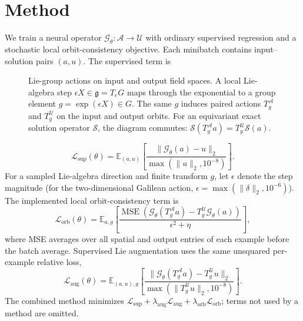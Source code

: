 \section{Method}
\label{sec:method}

We train a neural operator \(\mathcal G_\theta:\mathcal A\to\mathcal U\) with ordinary supervised regression and a stochastic local orbit-consistency objective. Each minibatch contains input--solution pairs \((a,u)\). The supervised term is

\begin{figure}[t]
\centering
\resizebox{0.92\linewidth}{!}{%

}
\caption{
Lie-group actions on input and output field spaces.
A local Lie-algebra step \(\epsilon X\in\mathfrak g=T_eG\) maps through the exponential to a group element \(g=\exp(\epsilon X)\in G\). The same \(g\) induces paired actions \(T_g^{\mathcal A}\) and \(T_g^{\mathcal U}\) on the input and output orbits. For an equivariant exact solution operator \(\mathcal S\), the diagram commutes: \(\mathcal S(T_g^{\mathcal A}a)=T_g^{\mathcal U}\mathcal S(a)\).
}
\label{fig:lie-group-actions}
\end{figure}

\begin{equation}
\mathcal L_{\mathrm{sup}}(\theta)=\mathbb E_{(a,u)}\left[
\frac{\|\mathcal G_\theta(a)-u\|_2}{\max(\|u\|_2,10^{-8})}
\right].
\end{equation}
For a sampled Lie-algebra direction and finite transform \(g\), let
\(\epsilon\) denote the step magnitude (for the two-dimensional Galilean action,
\(\epsilon=\max(\|\delta\|_2,10^{-6})\)).  The implemented local
orbit-consistency term is
\begin{equation}
\mathcal L_{\mathrm{orb}}(\theta)=\mathbb E_{a,g}\left[
\frac{\operatorname{MSE}\!\left(
\mathcal G_\theta(T_g^{\mathcal A}a)-T_g^{\mathcal U}\mathcal G_\theta(a)
\right)}{\epsilon^2+\eta}\right],
\end{equation}
where MSE averages over all spatial and output entries of each example before the
batch average.  Supervised Lie augmentation uses the same unsquared per-example
relative loss,
\begin{equation}
\mathcal L_{\mathrm{aug}}(\theta)=\mathbb E_{(a,u),g}\left[
\frac{\|\mathcal G_\theta(T_g^{\mathcal A}a)-T_g^{\mathcal U}u\|_2}
{\max(\|T_g^{\mathcal U}u\|_2,10^{-8})}\right].
\end{equation}
The combined method minimizes
\(\mathcal L_{\mathrm{sup}}+\lambda_{\mathrm{aug}}\mathcal L_{\mathrm{aug}}
+\lambda_{\mathrm{orb}}\mathcal L_{\mathrm{orb}}\); terms not used by a method
are omitted.

